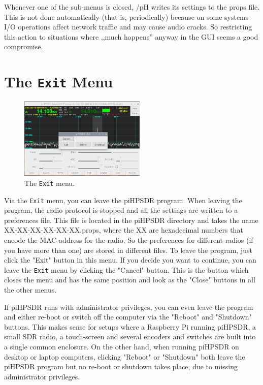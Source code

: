\documentclass[12pt]{book}
\def\bltt#1{\texttt{\color{blue}#1}}
\def\pH{pi\-HPSDR\xspace}
\begin{document}
Whenever one of the sub-menus is closed, /pH writes its settings to the props file. This is not done
automatically (that is, periodically) because on some systems I/O operations affect
network traffic and may cause audio cracks. So restricting this action to situations
where ,,much happens'' anyway in the GUI seems a good compromise.
\section{The \texttt{Exit} Menu}

\begin{figure}[ht]
\center
\includegraphics[width=6cm]{ExitMenu.png}
\caption{The \bltt{Exit} menu.}
\end{figure}

Via the \bltt{Exit} menu, you can leave the \pH program. When leaving the program,
the radio protocol is stopped and all the settings are written to a preferences file. This
file is located in the \pH directory and takes the name XX-XX-XX-XX-XX-XX.props, where
the XX are hexadecimal numbers that encode the MAC address for the radio.
So the preferences for different radios (if you
have more than one) are stored in different files. To leave the program, just click the
"Exit" button in this menu. If you decide you want to continue, you can leave the \bltt{Exit}
menu by clicking the "Cancel" button. This is the button which closes the menu and has
the same position and look as the "Close" buttons in all the other menus.

If \pH runs with administrator privileges, you can even leave the program and either re-boot
or switch off the computer via the "Reboot" and "Shutdown" buttons. This makes sense for setups
where a Raspberry Pi running \pH, a small SDR radio, a touch-screen and several encoders
and switches are built into a single common enclosure. On the other hand, when running
\pH on desktop or laptop computers, clicking "Reboot" or "Shutdown" both leave the \pH
program but no re-boot or shutdown takes place, due to missing administrator privileges.
\end{document}
